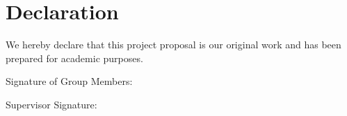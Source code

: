 \section{Declaration}
\label{sec:declaration}

We hereby declare that this project proposal is our original work and has been prepared for academic purposes.

\vspace{2cm}
Signature of Group Members:

\vspace{2cm}
Supervisor Signature: